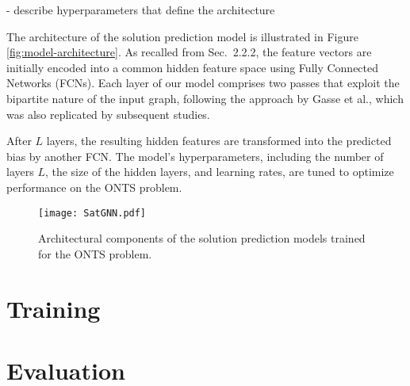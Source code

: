 - describe hyperparameters that define the architecture

The architecture of the solution prediction model is illustrated in Figure \ref{fig:model-architecture}. As recalled from Sec.~2.2.2, the feature vectors are initially encoded into a common hidden feature space using Fully Connected Networks (FCNs). Each layer of our model comprises two passes that exploit the bipartite nature of the input graph, following the approach by Gasse et al., which was also replicated by subsequent studies.


After \(L\) layers, the resulting hidden features are transformed into the predicted bias by another FCN. The model's hyperparameters, including the number of layers \(L\), the size of the hidden layers, and learning rates, are tuned to optimize performance on the ONTS problem.

\begin{figure}[h]
    \centering
    \texttt{[image: SatGNN.pdf]}
    \caption{Architectural components of the solution prediction models trained for the ONTS problem.} %
    \label{fig:satgnn}
\end{figure}


\section{Training}

\section{Evaluation}

